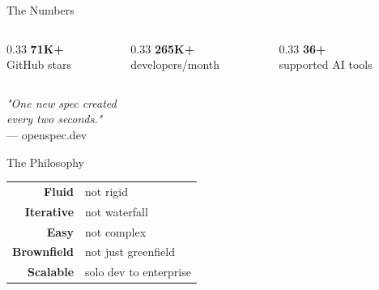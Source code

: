 \documentclass[aspectratio=169,18pt]{beamer}
\begin{document}
\begin{frame}{The Numbers}
  \vspace{0.5em}
  \begin{columns}[T]
    \begin{column}{0.33\textwidth}
      \centering
      {\fontsize{40}{48}\selectfont\textbf{\color{openblue}71K+}}\\[0.3em]
      \normalsize GitHub stars
    \end{column}
    \begin{column}{0.33\textwidth}
      \centering
      {\fontsize{40}{48}\selectfont\textbf{\color{openblue}265K+}}\\[0.3em]
      \normalsize developers/month
    \end{column}
    \begin{column}{0.33\textwidth}
      \centering
      {\fontsize{40}{48}\selectfont\textbf{\color{openblue}36+}}\\[0.3em]
      \normalsize supported AI tools
    \end{column}
  \end{columns}
\end{frame}

\begin{frame}{}
  \vspace{2.5em}
  \begin{center}
    {\Large\textit{"One new spec created}}\\[0.3em]
    {\Large\textit{every two seconds."}}\\[1.5em]
    \normalsize\color{opengray}— openspec.dev
  \end{center}
\end{frame}

\begin{frame}{The Philosophy}
  \vspace{0.5em}
  \begin{center}
    \begin{tabular}{r@{\quad}l}
      {\Large\textbf{Fluid}}      & not rigid \\[0.7em]
      {\Large\textbf{Iterative}}  & not waterfall \\[0.7em]
      {\Large\textbf{Easy}}       & not complex \\[0.7em]
      {\Large\textbf{Brownfield}} & not just greenfield \\[0.7em]
      {\Large\textbf{Scalable}}   & solo dev to enterprise \\
    \end{tabular}
  \end{center}
\end{frame}
\end{document}
